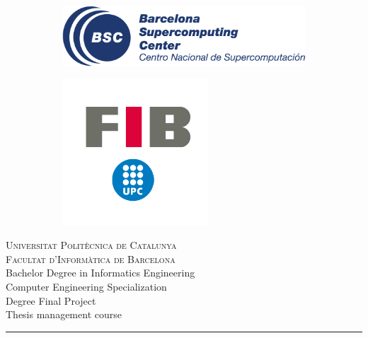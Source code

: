 \begin{titlepage}
  \newcommand{\HRule}{\rule{\linewidth}{0.5mm}}
  \begin{center}

    \begin{figure}
      \begin{subfigure}{0.5\textwidth}
        \centering
        \includegraphics[width=1\textwidth]{BSC-blue-large.png}
      \end{subfigure}
      \begin{subfigure}{0.5\textwidth}
        \centering
        \includegraphics[width=0.6\textwidth]{logo-fib.png}
      \end{subfigure}
    \end{figure}

    \textsc{\Large Universitat Politècnica de Catalunya}\\[0.1cm]
    \textsc{\large Facultat d'Informàtica de Barcelona}\\[0.4cm]
    {\large Bachelor Degree in Informatics Engineering}\\[0.1cm]
    {\large Computer Engineering Specialization}\\[0.1cm]
    {\large Degree Final Project}\\[0.1cm]
    {\large Thesis management course}\\[1cm]

    \HRule\\[0.4cm]


\end{center}
\end{titlepage}
